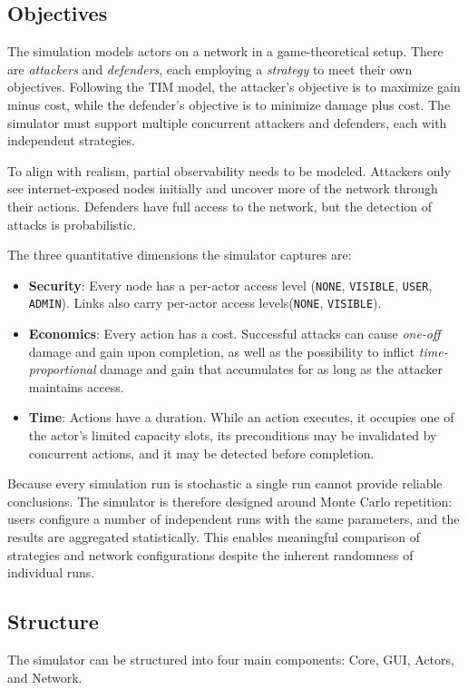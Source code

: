\documentclass{llncs}
\begin{document}
\subsection{Objectives}
The simulation models actors on a network in a game-theoretical setup. There are \emph{attackers} and \emph{defenders}, each employing a \emph{strategy} to meet their own objectives.
Following the TIM model, the attacker's objective is to maximize gain minus cost, while the defender's objective is to minimize damage plus cost. The simulator must support multiple concurrent attackers and defenders, each with independent strategies.

To align with realism, partial observability needs to be modeled. Attackers only see internet-exposed nodes initially and uncover more of the network through their actions. Defenders have full access to the network, but the detection of attacks is probabilistic.

The three quantitative dimensions the simulator captures are:
\begin{itemize}
  \item \textbf{Security}: Every node has a per-actor access level (\texttt{NONE}, \texttt{VISIBLE}, \texttt{USER}, \texttt{ADMIN}). Links also carry per-actor access levels(\texttt{NONE}, \texttt{VISIBLE}).
  \item \textbf{Economics}: Every action has a cost. Successful attacks can cause \emph{one-off} damage and gain upon completion, as well as the possibility to inflict \emph{time-proportional} damage and gain that accumulates for as long as the attacker maintains access.
  \item \textbf{Time}: Actions have a duration. While an action executes, it occupies one of the actor's limited capacity slots, its preconditions may be invalidated by concurrent actions, and it may be detected before completion.
\end{itemize}

Because every simulation run is stochastic a single run cannot provide reliable conclusions. The simulator is therefore designed around Monte Carlo repetition: users configure a number of independent runs with the same parameters, and the results are aggregated statistically. This enables meaningful comparison of strategies and network configurations despite the inherent randomness of individual runs.


\subsection{Structure}
The simulator can be structured into four main components: Core, GUI, Actors, and Network.
\end{document}
